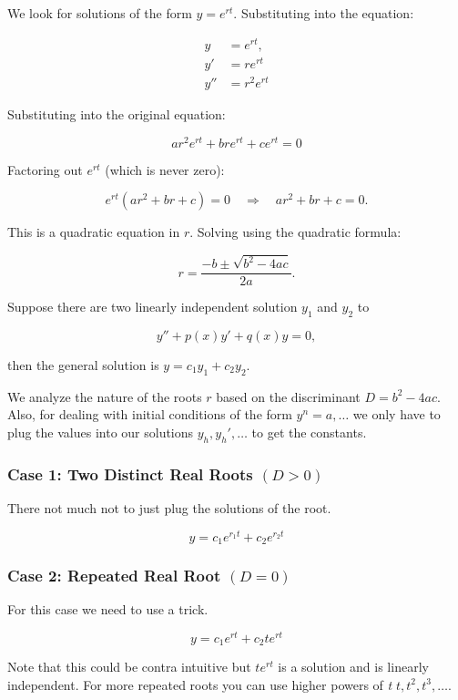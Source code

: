 We look for solutions of the form \( y = e^{rt} \). Substituting into the equation:

\begin{align*}
    y &= e^{rt}, \\
    y' &= r e^{rt} \\
    y'' &=  r^2 e^{rt}
\end{align*}


Substituting into the original equation:

\[
    ar^2 e^{rt} + bre^{rt} + ce^{rt} = 0
\]

Factoring out \( e^{rt} \) (which is never zero):

\[
    e^{rt}(ar^2 + br + c) = 0 \quad \Rightarrow \quad ar^2 + br + c = 0.
\]

This is a quadratic equation in \( r \). Solving using the quadratic formula:

\[
    r = \frac{-b \pm \sqrt{b^2 - 4ac}}{2a}.
\]

Suppose there are two linearly independent solution \(y_1\) and \(y_2\) to

\[
    y'' + p(x)y' + q(x)y = 0,
\]

then the general solution is \(y = c_1 y_1 + c_2 y_2\).
\vspace{\baselineskip}

We analyze the nature of the roots \( r \) based on the discriminant \( D = b^2 - 4ac \).
Also, for dealing with initial conditions of the form \(y^n = a, \dots\) we only have to 
plug the values into our solutions \(y_h, y_{h}', \dots \) to get the constants.

\subsubsection{Case 1: Two Distinct Real Roots \texorpdfstring{\( (D > 0) \)}{}}

There not much not to just plug the solutions of the root.

\[
    y = c_1 e^{r_1 t} + c_2 e^{r_2 t}
\]

\subsubsection{Case 2: Repeated Real Root \texorpdfstring{\( (D = 0) \)}{}}

For this case we need to use a trick.

\[
    y = c_1 e^{rt} + c_2 te^{rt}
\]

Note that this could be contra intuitive but \(te^{rt}\) is a solution and is linearly independent.
For more repeated roots you can use higher powers of \emph{t} \(t, t^2, t^3, \dots\).

